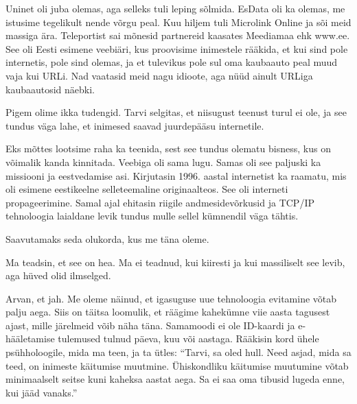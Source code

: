 
Uninet oli juba olemas, aga selleks tuli leping sõlmida. 
EsData oli ka olemas, me istusime tegelikult nende võrgu peal. 
Kuu hiljem tuli Microlink Online ja sõi meid massiga 
ära. Teleportist sai mõnesid partnereid kaasates 
Meediamaa ehk www.ee. See oli Eesti 
esimene veebiäri, kus proovisime inimestele rääkida, et kui sind pole 
internetis, pole sind olemas, ja et tulevikus pole sul oma kaubaauto peal muud vaja kui URLi. Nad vaatasid meid nagu idioote, aga nüüd ainult URLiga 
kaubaautosid näebki. 


Pigem olime ikka tudengid. Tarvi selgitas, et niisugust teenust turul ei ole, ja see 
tundus väga lahe, et inimesed saavad juurdepääsu internetile. 


Eks mõttes lootsime raha ka teenida, sest see tundus olematu bisness, 
kus on võimalik kanda kinnitada. Veebiga oli sama lugu. Samas oli see 
paljuski ka missiooni ja eestvedamise asi. Kirjutasin 1996. aastal internetist ka raamatu, mis oli esimene eestikeelne 
selleteemaline originaalteos. See oli interneti propageerimine. Samal ajal 
ehitasin riigile andmesidevõrkusid ja TCP/IP 
tehnoloogia laialdane levik tundus mulle sellel kümnendil väga tähtis.


Saavutamaks seda olukorda, kus me täna oleme. 


Ma teadsin, et see on hea. Ma ei teadnud, kui kiiresti ja kui massiliselt see levib, aga 
hüved olid ilmselged. 


Arvan, et jah. Me oleme näinud, et igasuguse uue tehnoloogia evitamine 
võtab palju aega. Siis on täitsa loomulik, et räägime kahekümne viie aasta tagusest ajast, mille järelmeid võib näha täna. Samamoodi
ei ole ID-kaardi ja e-hääletamise tulemused tulnud 
päeva, kuu või aastaga. Rääkisin kord 
ühele psühholoogile, mida ma teen, ja ta ütles: \enquote{Tarvi, sa oled 
hull. Need asjad, mida sa teed, on inimeste käitumise muutmine. Ühiskondliku 
käitumise muutumine võtab minimaalselt seitse kuni kaheksa aastat aega. Sa ei 
saa oma tibusid lugeda enne, kui jääd vanaks.}

